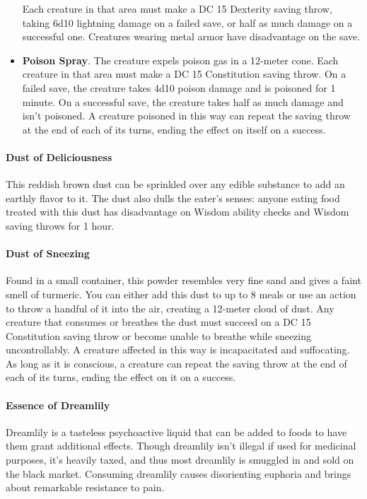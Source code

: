 \begin{itemize}
                Each creature in that area must make a DC 15 Dexterity saving throw, taking 6d10 lightning damage on a failed save, or half as much damage on a successful one.
                Creatures wearing metal armor have disadvantage on the save.
            \item \textbf{Poison Spray}.
                The creature expels poison gas in a 12-meter cone.
                Each creature in that area must make a DC 15 Constitution saving throw.
                On a failed save, the creature takes 4d10 poison damage and is poisoned for 1 minute.
                On a successful save, the creature takes half as much damage and isn't poisoned.
                A creature poisoned in this way can repeat the saving throw at the end of each of its turns, ending the effect on itself on a success.
        \end{itemize}
    \paragraph{Dust of Deliciousness}
        This reddish brown dust can be sprinkled over any edible substance to add an earthly flavor to it.
        The dust also dulls the eater's senses: anyone eating food treated with this dust has disadvantage on Wisdom ability checks and Wisdom saving throws for 1 hour.
    \paragraph{Dust of Sneezing}
        Found in a small container, this powder resembles very fine sand and gives a faint smell of turmeric.
        You can either add this dust to up to 8 meals or use an action to throw a handful of it into the air, creating a 12-meter cloud of dust.
        Any creature that consumes or breathes the dust must succeed on a DC 15 Constitution saving throw or become unable to breathe while sneezing uncontrollably.
        A creature affected in this way is incapacitated and suffocating.
        As long as it is conscious, a creature can repeat the saving throw at the end of each of its turns, ending the effect on it on a success.
    \paragraph{Essence of Dreamlily}
        Dreamlily is a tasteless psychoactive liquid that can be added to foods to have them grant additional effects.
        Though dreamlily isn't illegal if used for medicinal purposes, it's heavily taxed, and thus most dreamlily is smuggled in and sold on the black market.
        Consuming dreamlily causes disorienting euphoria and brings about remarkable resistance to pain.

